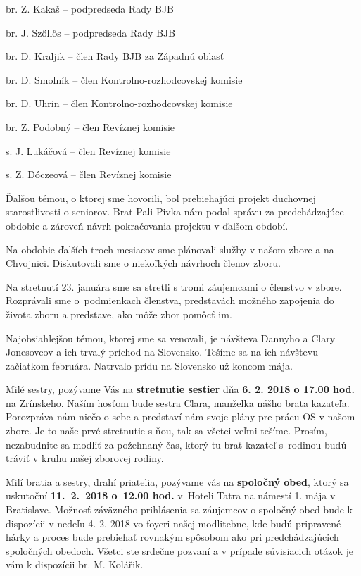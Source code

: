 br. Z. Kakaš – podpredseda Rady BJB

br. J. Szőllős – podpredseda Rady BJB

br. D. Kraljik – člen Rady BJB za Západnú oblasť

br. D. Smolník – člen Kontrolno-rozhodcovskej komisie

br. D. Uhrin – člen Kontrolno-rozhodcovskej komisie

br. Z. Podobný – člen Revíznej komisie

s. J. Lukáčová – člen Revíznej komisie

s. Z. Dóczeová – člen Revíznej komisie

Ďalšou témou, o ktorej sme hovorili, bol prebiehajúci projekt duchovnej starostlivosti o seniorov. Brat Pali Pivka nám podal správu za predchádzajúce obdobie a zároveň návrh pokračovania projektu v ďalšom období.

Na obdobie ďalších troch mesiacov sme plánovali služby v našom zbore a na Chvojnici.
Diskutovali sme o niekoľkých návrhoch členov zboru.

Na stretnutí 23. januára sme sa stretli s tromi záujemcami o členstvo v zbore. Rozprávali sme o~podmienkach členstva, predstavách možného zapojenia do života zboru a predstave, ako môže zbor pomôcť im.

Najobsiahlejšou témou, ktorej sme sa venovali, je návšteva Dannyho a Clary Jonesovcov a ich trvalý príchod na Slovensko. Tešíme sa na ich návštevu začiatkom februára. Natrvalo prídu na Slovensko už koncom mája.


Milé sestry, pozývame Vás na {\bf stretnutie sestier} dňa {\bf 6. 2. 2018 o 17.00 hod.} na Zrínskeho.
Naším hosťom bude sestra Clara, manželka nášho brata kazateľa. Porozpráva nám niečo o sebe a predstaví nám svoje plány pre prácu OS v našom zbore. Je to naše prvé stretnutie s ňou, tak sa všetci veľmi tešíme.
Prosím, nezabudnite sa modliť za požehnaný čas, ktorý tu brat kazateľ s~rodinou budú tráviť v kruhu našej zborovej rodiny.



Milí bratia a sestry, drahí priatelia,
pozývame vás na {\bf spoločný obed}, ktorý sa uskutoční {\bf 11.~2.~2018 o~12.00 hod.} v~Hoteli Tatra na námestí 1. mája v Bratislave. Možnosť záväzného prihlásenia sa záujemcov o spoločný obed bude k dispozícii v nedeľu 4. 2. 2018 vo foyeri našej modlitebne, kde budú pripravené hárky a proces bude prebiehať rovnakým spôsobom ako pri predchádzajúcich spoločných obedoch. Všetci ste srdečne pozvaní a v prípade súvisiacich otázok je vám k dispozícii br. M. Kolářik.

